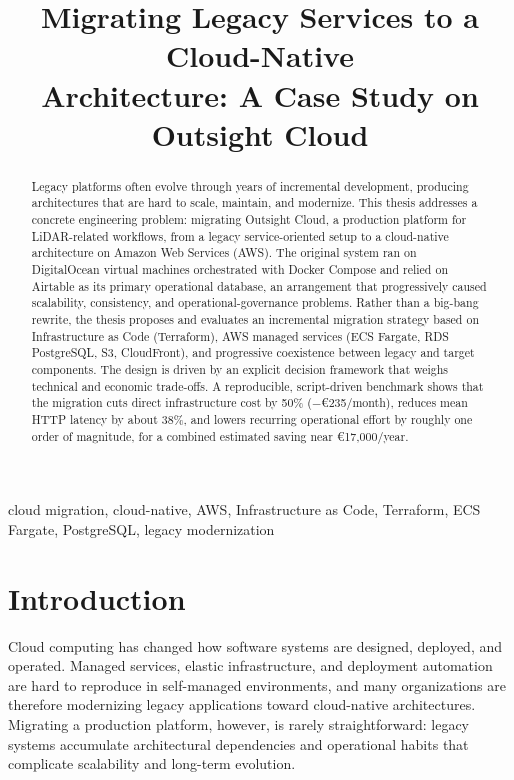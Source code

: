 \documentclass[conference]{IEEEtran}
\begin{document}
\title{Migrating Legacy Services to a Cloud-Native\\
Architecture: A Case Study on Outsight Cloud}

\author{
}

\maketitle

\begin{abstract}
Legacy platforms often evolve through years of incremental development,
producing architectures that are hard to scale, maintain, and modernize.
This thesis addresses a concrete engineering problem: migrating Outsight
Cloud, a production platform for LiDAR-related workflows, from a legacy
service-oriented setup to a cloud-native architecture on Amazon Web
Services (AWS). The original system ran on DigitalOcean virtual machines
orchestrated with Docker Compose and relied on Airtable as its primary
operational database, an arrangement that progressively caused scalability,
consistency, and operational-governance problems. Rather than a big-bang
rewrite, the thesis proposes and evaluates an incremental migration
strategy based on Infrastructure as Code (Terraform), AWS managed services
(ECS Fargate, RDS PostgreSQL, S3, CloudFront), and progressive coexistence
between legacy and target components. The design is driven by an explicit
decision framework that weighs technical and economic trade-offs. A
reproducible, script-driven benchmark shows that the migration cuts direct
infrastructure cost by 50\% ($-$\euro235/month), reduces mean HTTP
latency by about 38\%, and lowers recurring operational effort by roughly
one order of magnitude, for a combined estimated saving near
\euro17{,}000/year.
\end{abstract}

\begin{IEEEkeywords}
cloud migration, cloud-native, AWS, Infrastructure as Code, Terraform,
ECS Fargate, PostgreSQL, legacy modernization
\end{IEEEkeywords}

\section{Introduction}
Cloud computing has changed how software systems are designed, deployed,
and operated. Managed services, elastic infrastructure, and deployment
automation are hard to reproduce in self-managed environments, and many
organizations are therefore modernizing legacy applications toward
cloud-native architectures. Migrating a production platform, however, is
rarely straightforward: legacy systems accumulate architectural
dependencies and operational habits that complicate scalability and
long-term evolution.
\end{document}
